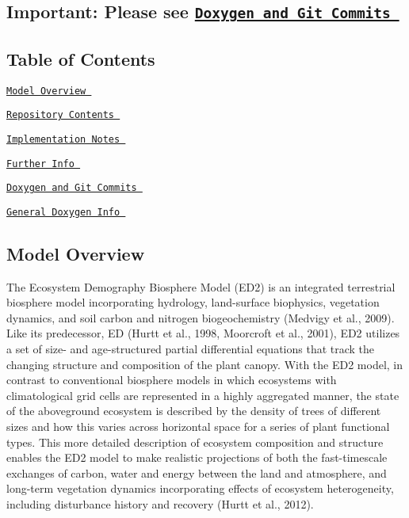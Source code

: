 \subsection*{Important\+: Please see \href{#doxygit}{\tt Doxygen and Git Commits }}

\subsection*{Table of Contents}


\begin{DoxyEnumerate}
\item \href{#overview}{\tt Model Overview }
\item \href{#contents}{\tt Repository Contents }
\item \href{#implementation}{\tt Implementation Notes }
\item \href{#info}{\tt Further Info }
\begin{DoxyEnumerate}
\item \href{#doxygit}{\tt Doxygen and Git Commits }
\end{DoxyEnumerate}
\begin{DoxyEnumerate}
\item \href{#doxyinfo}{\tt General Doxygen Info }
\end{DoxyEnumerate}
\end{DoxyEnumerate}

\subsection*{\label{_overview}%
 Model Overview }

The Ecosystem Demography Biosphere Model (E\+D2) is an integrated terrestrial biosphere model incorporating hydrology, land-\/surface biophysics, vegetation dynamics, and soil carbon and nitrogen biogeochemistry (Medvigy et al., 2009). Like its predecessor, ED (Hurtt et al., 1998, Moorcroft et al., 2001), E\+D2 utilizes a set of size-\/ and age-\/structured partial differential equations that track the changing structure and composition of the plant canopy. With the E\+D2 model, in contrast to conventional biosphere models in which ecosystems with climatological grid cells are represented in a highly aggregated manner, the state of the aboveground ecosystem is described by the density of trees of different sizes and how this varies across horizontal space for a series of plant functional types. This more detailed description of ecosystem composition and structure enables the E\+D2 model to make realistic projections of both the fast-\/timescale exchanges of carbon, water and energy between the land and atmosphere, and long-\/term vegetation dynamics incorporating effects of ecosystem heterogeneity, including disturbance history and recovery (Hurtt et al., 2012).

